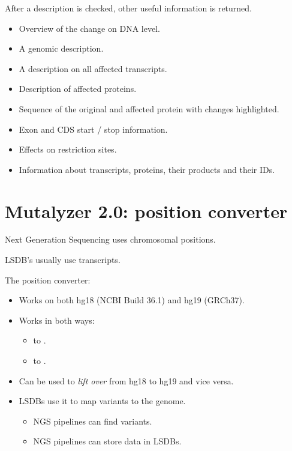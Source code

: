 \documentclass[slidestop]{beamer}
\begin{document}
\begin{frame}
  After a description is checked, other useful information is returned.
  \begin{itemize}
    \pause
    \item Overview of the change on DNA level.
    \pause
    \item A genomic description.
    \pause
    \item A description on all affected transcripts.
    \pause
    \item Description of affected proteins.
    \pause
    \item Sequence of the original and affected protein with changes
      highlighted.
    \pause
    \item Exon and CDS start / stop information.
    \pause
    \item Effects on restriction sites.
    \pause
    \item Information about transcripts, prote\"ins, their products and their
      IDs.
  \end{itemize}
\end{frame}

\section{Mutalyzer 2.0: position converter}
\begin{frame}
  Next Generation Sequencing uses chromosomal positions.

  LSDB's usually use transcripts.
  \bigskip

  The position converter:
  \begin{itemize}
    \pause
    \item Works on both hg18 (NCBI Build 36.1) and hg19 (GRCh37).
    \pause
    \item Works in both ways:
    \begin{itemize}
      \item {} to
            .
      \item {} to
            .
    \end{itemize}
    \pause
    \item Can be used to \emph{lift over} from hg18 to hg19 and vice versa.
    \pause
    \item LSDBs use it to map variants to the genome.
    \begin{itemize}
      \item NGS pipelines can find variants.
      \item NGS pipelines can store data in LSDBs.
    \end{itemize}
  \end{itemize}
\end{frame}
\end{document}
